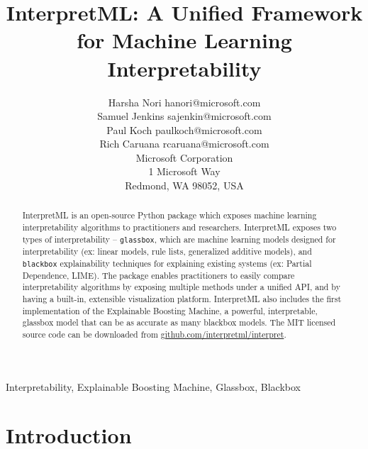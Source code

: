 \documentclass[twoside,11pt]{article}
\begin{document}
\title{InterpretML: A Unified Framework for Machine Learning Interpretability}

\author{\name Harsha Nori    \email hanori@microsoft.com    \\
        \name Samuel Jenkins \email sajenkin@microsoft.com  \\
        \name Paul Koch      \email paulkoch@microsoft.com  \\
        \name Rich Caruana    \email rcaruana@microsoft.com \\
       \addr Microsoft Corporation \\
       1 Microsoft Way \\
       Redmond, WA 98052, USA}

\editor{}
\maketitle


\begin{abstract}%



InterpretML is an open-source Python package which exposes machine learning interpretability algorithms to practitioners and researchers. InterpretML exposes two types of interpretability -- \texttt{glassbox}, which are machine learning models designed for interpretability (ex: linear models, rule lists, generalized additive models), and \texttt{blackbox} explainability techniques for explaining existing systems (ex: Partial Dependence, LIME). The package enables practitioners to easily compare interpretability algorithms by exposing multiple methods under a unified API, and by having a built-in, extensible visualization platform. InterpretML also includes the first implementation of the Explainable Boosting Machine, a powerful, interpretable, glassbox model that can be as accurate as many blackbox models. The MIT licensed source code can be downloaded from \href{https://github.com/interpretml/interpret}{github.com/interpretml/interpret}. 

\end{abstract}

\begin{keywords}
Interpretability, Explainable Boosting Machine, Glassbox, Blackbox
\end{keywords}

\section{Introduction}
\end{document}
